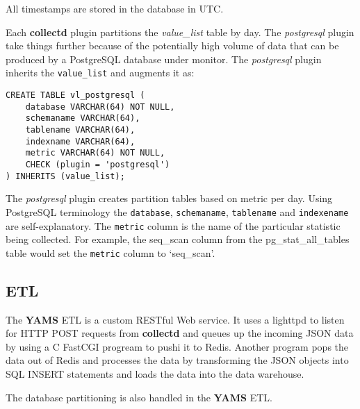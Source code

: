 \documentclass[a4paper,twoside,12pt]{article}
\begin{document}
All timestamps are stored in the database in UTC.

Each \textbf{collectd} plugin partitions the \textit{value\_list} table by day.
The \textit{postgresql} plugin take things further because of the potentially
high volume of data that can be produced by a PostgreSQL database under
monitor.  The \textit{postgresql} plugin inherits the \texttt{value\_list} and
augments it as:

\lstset{language=sql}
\begin{lstlisting}
CREATE TABLE vl_postgresql (
    database VARCHAR(64) NOT NULL,
    schemaname VARCHAR(64),
    tablename VARCHAR(64),
    indexname VARCHAR(64),
    metric VARCHAR(64) NOT NULL,
    CHECK (plugin = 'postgresql')
) INHERITS (value_list);
\end{lstlisting}

The \textit{postgresql} plugin creates partition tables based on metric per
day.  Using PostgreSQL terminology the \texttt{database}, \texttt{schemaname},
\texttt{tablename} and \texttt{indexename} are self-explanatory.  The
\texttt{metric} column is the name of the particular statistic being collected.
For example, the seq\_scan column from the pg\_stat\_all\_tables table would
set the \texttt{metric} column to `seq\_scan'.

\subsection{ETL}

The \textbf{YAMS} ETL is a custom RESTful Web service.  It uses a lighttpd to
listen for HTTP POST requests from \textbf{collectd} and queues up the incoming
JSON data by using a C FastCGI progream to pushi it to Redis.  Another program
pops the data out of Redis and processes the data by transforming the JSON
objects into SQL INSERT statements and loads the data into the data warehouse.

The database partitioning is also handled in the \textbf{YAMS} ETL.
\end{document}
